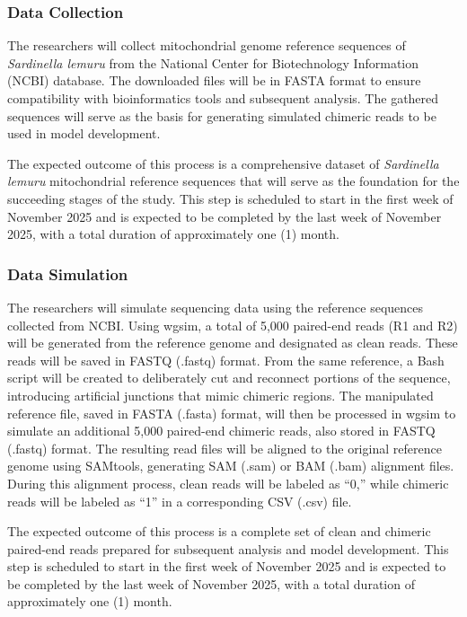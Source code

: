 \documentclass{article}
\begin{document}
 \subsubsection{Data Collection} 
The researchers will collect mitochondrial genome reference sequences of \textit{Sardinella lemuru} from the National Center for Biotechnology Information (NCBI) database. The downloaded files will be in FASTA format to ensure compatibility with bioinformatics tools and subsequent analysis. The gathered sequences will serve as the basis for generating simulated chimeric reads to be used in model development.

The expected outcome of this process is a comprehensive dataset of \textit{Sardinella lemuru} mitochondrial reference sequences that will serve as the foundation for the succeeding stages of the study. This step is scheduled to start in the first week of November 2025 and is expected to be completed by the last week of November 2025, with a total duration of approximately one (1) month.

 \subsubsection{Data Simulation} 
 The researchers will simulate sequencing data using the reference sequences collected from NCBI. Using wgsim, a total of 5,000 paired-end reads (R1 and R2) will be generated from the reference genome and designated as clean reads. These reads will be saved in FASTQ (.fastq) format. From the same reference, a Bash script will be created to deliberately cut and reconnect portions of the sequence, introducing artificial junctions that mimic chimeric regions. The manipulated reference file, saved in FASTA (.fasta) format, will then be processed in wgsim to simulate an additional 5,000 paired-end chimeric reads, also stored in FASTQ (.fastq) format. The resulting read files will be aligned to the original reference genome using SAMtools, generating SAM (.sam) or BAM (.bam) alignment files. During this alignment process, clean reads will be labeled as “0,” while chimeric reads will be labeled as “1” in a corresponding CSV (.csv) file.

 The expected outcome of this process is a complete set of clean and chimeric paired-end reads prepared for subsequent analysis and model development. This step is scheduled to start in the first week of November 2025 and is expected to be completed by the last week of November 2025, with a total duration of approximately one (1) month.
\end{document}
